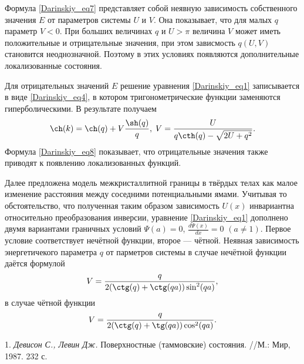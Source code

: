 Формула \eqref{Darinskiy_eq7} представляет собой неявную зависимость собственного значения $E$ от параметров
системы $U$ и $V$. Она показывает, что для малых $q$ параметр $V<0$. При больших величинах $q$ и $U>\pi$ величина $V$
может иметь положительные и отрицательные значения, при этом зависмость $q(U,V)$ становится
неоднозначной. Поэтому в этих условиях появляются дополнительные локализованные состояния.
\par Для отрицательных значений $E$ решение уравнения \eqref{Darinskiy_eq1} записывается в виде \eqref{Darinskiy_eq4}, в котором тригонометрические функции заменяются гиперболическими.
В результате получаем
\begin{multline} \label{Darinskiy_eq8}
\ch(k)=\ch(q)+V\frac{\sh(q)}{q},\;V=\frac{U}{q\cth(q)-\sqrt{2U+q^2}}.
\end{multline}
Формула \eqref{Darinskiy_eq8} показывает, что отрицательные значения также приводят к появлению локализованных функций.
\par Далее предложена модель межкристаллитной границы в твёрдых телах как малое изменение расстояния между соседними потенциальными ямами. Учитывая то обстоятельство, что полученная таким образом зависимость $U(x)$
инвариантна относительно преобразования инверсии, уравнение \eqref{Darinskiy_eq1} дополнено двумя вариантами граничных условий
$\Psi(a)=0$, $\frac{d\Psi(x)}{dx}=0$ $(a\neq1)$. Первое условие соответствует
нечётной функции, второе — чётной. Неявная зависимость энергетичекого параметра $q$ от парметров системы в случае нечётной функции даётся формулой
\begin{equation*}
V=\frac{q}{2(\ctg(q)+\ctg(qa))\sin^2(qa)},
\end{equation*}
в случае чётной функции
\begin{equation*}
V=\frac{q}{2(\ctg(q)+\tg(qa))\cos^2(qa)}.
\end{equation*}

\litlist

1. {\it Девисон С., Левин Дж.} Поверхностные (таммовские) состояния. //М.: Мир, 1987. 232 с.

